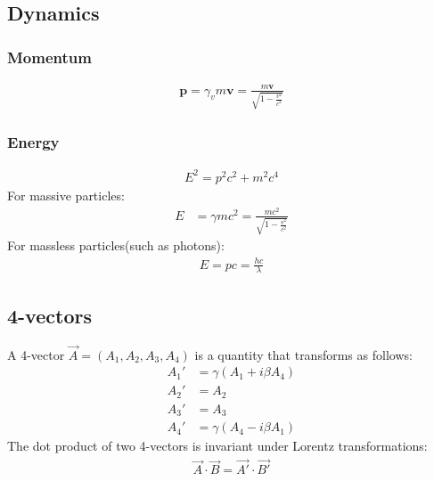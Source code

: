 \documentclass[11pt, letterpaper]{article}
\newcommand{\ve}[1]{
  \ensuremath{\bm{#1}}}	               %
\newcommand{\fve}[1]{
  \ensuremath{\vec{#1}}}               %
\begin{document}
\begin{multicols*}{3}
\subsection{Dynamics}
\subsubsection{Momentum}
\begin{align*}
  \ve{p}=\gamma_vm\ve{v}=\frac{m\ve{v}}{\sqrt{1-\frac{v^2}{c^2}}}
\end{align*}
\subsubsection{Energy}
\begin{align*}
  E^2=p^2c^2+m^2c^4
\end{align*}
For massive particles:
\begin{align*}
  E&=\gamma mc^2=\frac{mc^2}{\sqrt{1-\frac{v^2}{c^2}}}
\end{align*}
For massless particles(such as photons):
\begin{align*}
  E=pc=\frac{hc}{\lambda}
\end{align*}
\subsection{4-vectors}
A 4-vector $\fve{A}=(A_1,A_2,A_3,A_4)$ is a quantity that transforms as follows:
\begin{align*}
  A_1'&= \gamma(A_1+i\beta A_4)\\
  A_2'&= A_2\\
  A_3'&= A_3\\
  A_4'&= \gamma(A_4-i\beta A_1)
\end{align*}
The dot product of two 4-vectors is invariant under Lorentz transformations:
\begin{align*}
  \fve{A}\cdot\fve{B}=\fve{A'}\cdot\fve{B'}
\end{align*}

\end{multicols*}
\end{document}
